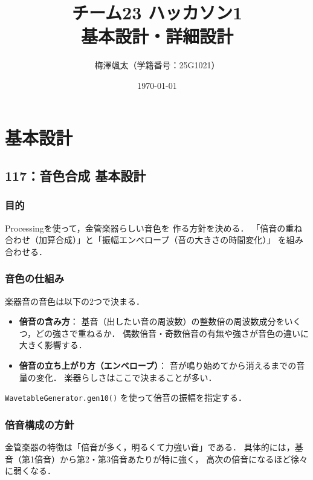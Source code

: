 \documentclass[a4paper,12pt]{jsarticle}
\title{チーム23 ハッカソン1\\
       基本設計・詳細設計\\[0.5em]
       }
\author{梅澤颯太（学籍番号：25G1021）}
\date{\today}
\begin{document}
\maketitle
\tableofcontents
\newpage

\section{基本設計}

\subsection{117：音色合成 基本設計}

\subsubsection{目的}
Processingを使って，金管楽器らしい音色を
作る方針を決める．
「倍音の重ね合わせ（加算合成）」と「振幅エンベロープ（音の大きさの時間変化）」
を組み合わせる．

\subsubsection{音色の仕組み}
楽器音の音色は以下の2つで決まる．

\begin{itemize}
  \item \textbf{倍音の含み方}：
        基音（出したい音の周波数）の整数倍の周波数成分をいくつ，どの強さで重ねるか．
        偶数倍音・奇数倍音の有無や強さが音色の違いに大きく影響する．
  \item \textbf{倍音の立ち上がり方（エンベロープ）}：
        音が鳴り始めてから消えるまでの音量の変化．
        楽器らしさはここで決まることが多い．
\end{itemize}

\noindent
\texttt{WavetableGenerator.gen10()} を使って倍音の振幅を指定する．

\subsubsection{倍音構成の方針}

金管楽器の特徴は「倍音が多く，明るくて力強い音」である．
具体的には，基音（第1倍音）から第2・第3倍音あたりが特に強く，
高次の倍音になるほど徐々に弱くなる．
\end{document}
